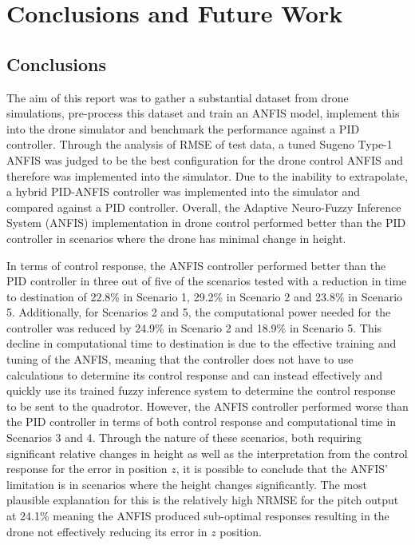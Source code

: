 \chapter{Conclusions and Future Work} 
\section{Conclusions}
The aim of this report was to gather a substantial dataset from drone simulations, pre-process this dataset and train an ANFIS model, implement this into the drone simulator and benchmark the performance against a PID controller. Through the analysis of RMSE of test data, a tuned Sugeno Type-1 ANFIS was judged to be the best configuration for the drone control ANFIS and therefore was implemented into the simulator. Due to the inability to extrapolate, a hybrid PID-ANFIS controller was implemented into the simulator and compared against a PID controller. Overall, the Adaptive Neuro-Fuzzy Inference System (ANFIS) implementation in drone control performed better than the PID controller in scenarios where the drone has minimal change in height. 

In terms of control response, the ANFIS controller performed better than the PID controller in three out of five of the scenarios tested with a reduction in time to destination of 22.8\% in Scenario 1, 29.2\% in Scenario 2 and 23.8\% in Scenario 5. Additionally, for Scenarios 2 and 5, the computational power needed for the controller was reduced by 24.9\% in Scenario 2 and 18.9\% in Scenario 5. This decline in computational time to destination is due to the effective training and tuning of the ANFIS, meaning that the controller does not have to use calculations to determine its control response and can instead effectively and quickly use its trained fuzzy inference system to determine the control response to be sent to the quadrotor. However, the ANFIS controller performed worse than the PID controller in terms of both control response and computational time in Scenarios 3 and 4. Through the nature of these scenarios, both requiring significant relative changes in height as well as the interpretation from the control response for the error in position $z$, it is possible to conclude that the ANFIS' limitation is in scenarios where the height changes significantly. The most plausible explanation for this is the relatively high NRMSE for the pitch output at 24.1\% meaning the ANFIS produced sub-optimal responses resulting in the drone not effectively reducing its error in $z$ position. 


